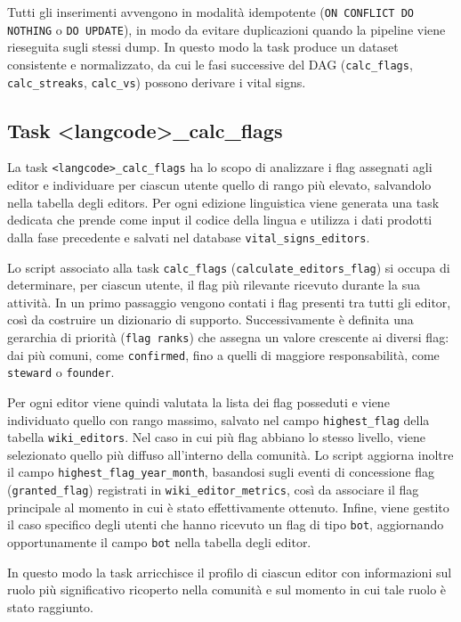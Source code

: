Tutti gli inserimenti avvengono in modalità idempotente (\texttt{ON CONFLICT DO NOTHING} o \texttt{DO UPDATE}), in modo da evitare duplicazioni quando la pipeline viene rieseguita sugli stessi dump. 
In questo modo la task produce un dataset consistente e normalizzato, da cui le fasi successive del DAG (\texttt{calc\_flags}, \texttt{calc\_streaks}, \texttt{calc\_vs}) possono derivare i vital signs.

\subsection{Task \textless langcode\textgreater\_calc\_flags}
\label{subsec:calc_flags}

La task \texttt{<langcode>\_calc\_flags} ha lo scopo di analizzare i flag assegnati agli editor
e individuare per ciascun utente quello di rango più elevato,
salvandolo nella tabella degli editors.
Per ogni edizione linguistica viene generata una task dedicata che prende come input il codice della lingua e utilizza i dati prodotti dalla fase precedente e salvati nel database \texttt{vital\_signs\_editors}.

Lo script associato alla task \texttt{calc\_flags} (\texttt{calculate\_editors\_flag}) si occupa di determinare, per ciascun utente, il flag più rilevante ricevuto durante la sua attività. In un primo passaggio vengono contati i flag presenti tra tutti gli editor, così da costruire un dizionario di supporto. Successivamente è definita una gerarchia di priorità (\texttt{flag ranks}) che assegna un valore crescente ai diversi flag: dai più comuni, come \texttt{confirmed}, fino a quelli di maggiore responsabilità, come \texttt{steward} o \texttt{founder}.

Per ogni editor viene quindi valutata la lista dei flag posseduti e viene individuato quello con rango massimo, salvato nel campo \texttt{highest\_flag} della tabella \texttt{wiki\_editors}. Nel caso in cui più flag abbiano lo stesso livello, viene selezionato quello più diffuso all’interno della comunità. Lo script aggiorna inoltre il campo \texttt{highest\_flag\_year\_month}, basandosi sugli eventi di concessione flag (\texttt{granted\_flag}) registrati in \texttt{wiki\_editor\_metrics}, così da associare il flag principale al momento in cui è stato effettivamente ottenuto. Infine, viene gestito il caso specifico degli utenti che hanno ricevuto un flag di tipo \texttt{bot}, aggiornando opportunamente il campo \texttt{bot} nella tabella degli editor.

In questo modo la task arricchisce il profilo di ciascun editor con informazioni sul ruolo più significativo ricoperto nella comunità e sul momento in cui tale ruolo è stato raggiunto.


